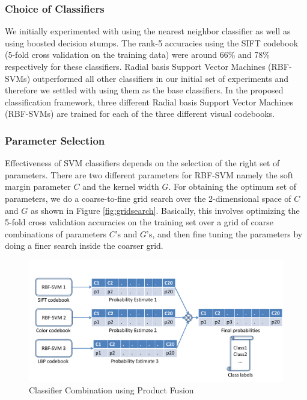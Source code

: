 \documentclass[12pt]{article}
\begin{document}
\subsubsection{Choice of Classifiers}
We initially experimented with using the nearest neighbor classifier as well as using boosted decision stumps. The rank-5 accuracies using the SIFT codebook (5-fold cross validation on the training data) were around 66\% and 78\% respectively for these classifiers. Radial basis Support Vector Machines (RBF-SVMs) outperformed all other classifiers in our initial set of experiments and therefore we settled with using them as the base classifiers. In the proposed classification framework, three different Radial basis Support Vector Machines (RBF-SVMs) are trained for each of the three different visual codebooks.

\subsubsection{Parameter Selection}
Effectiveness of SVM classifiers depends on the selection of the right set of parameters. There are two different parameters for RBF-SVM namely the soft margin parameter $C$ and the kernel width $G$. For obtaining the optimum set of parameters, we do a coarse-to-fine grid search over the 2-dimensional space of $C$ and $G$ as shown in Figure \ref{fig:gridsearch}. Basically, this involves optimizing the 5-fold cross validation accuracies on the training set over a grid of coarse combinations of parameters $C$'s and $G$'s, and then fine tuning the parameters by doing a finer search inside the coarser grid.

\begin{figure}
\includegraphics[width = 1\textwidth]{classifiercombination}
\caption{Classifier Combination using Product Fusion}
\label{fig:classifiercombination}
\end{figure}
\end{document}
